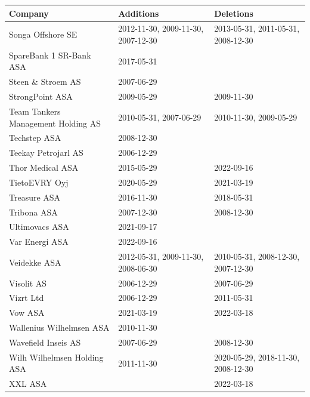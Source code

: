 \begin{table}[H]
\centering
\begin{tabularx}{\textwidth}{XXX}
\toprule
Company & Additions & Deletions \\ 
\midrule
Songa Offshore SE & 2012-11-30, 2009-11-30, 2007-12-30 & 2013-05-31, 2011-05-31, 2008-12-30 \\
SpareBank 1 SR-Bank ASA & 2017-05-31 & \\
Steen \& Stroem AS & 2007-06-29 & \\
StrongPoint ASA & 2009-05-29 & 2009-11-30 \\
Team Tankers Management Holding AS & 2010-05-31, 2007-06-29 & 2010-11-30, 2009-05-29 \\
Techstep ASA & 2008-12-30 & \\
Teekay Petrojarl AS & 2006-12-29 & \\
Thor Medical ASA & 2015-05-29 & 2022-09-16 \\
TietoEVRY Oyj & 2020-05-29 & 2021-03-19 \\
Treasure ASA & 2016-11-30 & 2018-05-31 \\
Tribona ASA & 2007-12-30 & 2008-12-30 \\
Ultimovacs ASA & 2021-09-17 & \\
Var Energi ASA & 2022-09-16 & \\
Veidekke ASA & 2012-05-31, 2009-11-30, 2008-06-30 & 2010-05-31, 2008-12-30, 2007-12-30 \\
Visolit AS & 2006-12-29 & 2007-06-29 \\
Vizrt Ltd & 2006-12-29 & 2011-05-31 \\
Vow ASA & 2021-03-19 & 2022-03-18 \\
Wallenius Wilhelmsen ASA & 2010-11-30 & \\
Wavefield Inseis AS & 2007-06-29 & 2008-12-30 \\
Wilh Wilhelmsen Holding ASA & 2011-11-30 & 2020-05-29, 2018-11-30, 2008-12-30 \\
XXL ASA &  & 2022-03-18 \\
\bottomrule
\end{tabularx}
\end{table}



